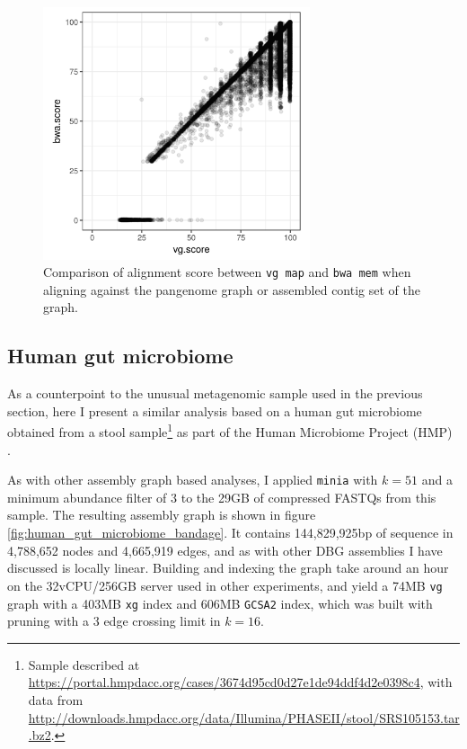 \begin{figure}[htbp!]
  \centering
  \includegraphics[width=0.7\textwidth]{Chapter3/Figs/ERR414817_holdout_bwa_vs_vg_k51_m3.png}
  \caption[Comparing {\tt vg} and {\tt bwa} alignment to the viral metagenome]{
    Comparison of alignment score between {\tt vg map} and {\tt bwa mem} when aligning against the pangenome graph or assembled contig set of the graph.
  }
  \label{fig:viral_metagenome_scatter}
\end{figure}

\subsection{Human gut microbiome}

As a counterpoint to the unusual metagenomic sample used in the previous section, here I present a similar analysis based on a human gut microbiome obtained from a stool sample\footnote{Sample described at \url{https://portal.hmpdacc.org/cases/3674d95cd0d27e1de94ddf4d2e0398c4}, with data from \url{http://downloads.hmpdacc.org/data/Illumina/PHASEII/stool/SRS105153.tar.bz2}.} as part of the Human Microbiome Project (HMP) \cite{turnbaugh2007human,peterson2009nih}.

As with other assembly graph based analyses, I applied {\tt minia} with $k=51$ and a minimum abundance filter of 3 to the 29GB of compressed FASTQs from this sample.
The resulting assembly graph is shown in figure \ref{fig:human_gut_microbiome_bandage}.
It contains 144,829,925bp of sequence in 4,788,652 nodes and 4,665,919 edges, and as with other DBG assemblies I have discussed is locally linear.
Building and indexing the graph take around an hour on the 32vCPU/256GB server used in other experiments, and yield a 74MB {\tt vg} graph with a 403MB {\tt xg} index and 606MB {\tt GCSA2} index, which was built with pruning with a 3 edge crossing limit in $k=16$.

